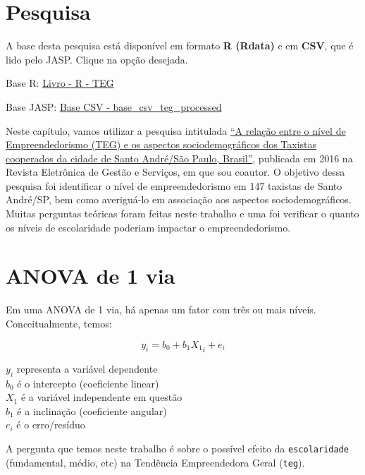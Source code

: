 \documentclass[
]{book}
\begin{document}
\hypertarget{pesquisa-3}{%
\section{Pesquisa}\label{pesquisa-3}}

\begin{base}

A base desta pesquisa está disponível em formato \textbf{R (Rdata)} e em \textbf{CSV}, que é lido pelo JASP. Clique na opção desejada.

Base R: \href{https://github.com/anovabr/mqt/raw/master/bases/Livro\%20-\%20R\%20-\%20TEG.RData}{Livro - R - TEG}

Base JASP: \href{https://github.com/anovabr/mqt/raw/master/bases/bases_csv_jasp.zip}{Base CSV - base\_csv\_teg\_processed}

\end{base}

Neste capítulo, vamos utilizar a pesquisa intitulada \href{https://www.metodista.br/revistas/revistas-metodista/index.php/REGS/article/view/6453}{``A relação entre o nível de Empreendedorismo (TEG) e os aspectos sociodemográficos dos Taxistas cooperados da cidade de Santo André/São Paulo, Brasil''}, publicada em 2016 na Revista Eletrônica de Gestão e Serviços, em que sou coautor. O objetivo dessa pesquisa foi identificar o nível de empreendedorismo em 147 taxistas de Santo André/SP, bem como averiguá-lo em associação aos aspectos sociodemográficos. Muitas perguntas teóricas foram feitas neste trabalho e uma foi verificar o quanto os níveis de escolaridade poderiam impactar o empreendedorismo.

\hypertarget{anova-de-1-via}{%
\section{ANOVA de 1 via}\label{anova-de-1-via}}

Em uma ANOVA de 1 via, há apenas um fator com três ou mais níveis. Conceitualmente, temos:

\[y_i = b_0 + b_1X{_1}_i + e_i\]

\(y_i\) representa a variável dependente\\
\(b_0\) é o intercepto (coeficiente linear)\\
\(X_1\) é a variável independente em questão\\
\(b_1\) é a inclinação (coeficiente angular)\\
\(e_i\) é o erro/resíduo

A pergunta que temos neste trabalho é sobre o possível efeito da \texttt{escolaridade} (fundamental, médio, etc) na Tendência Empreendedora Geral (\texttt{teg}).
\end{document}
